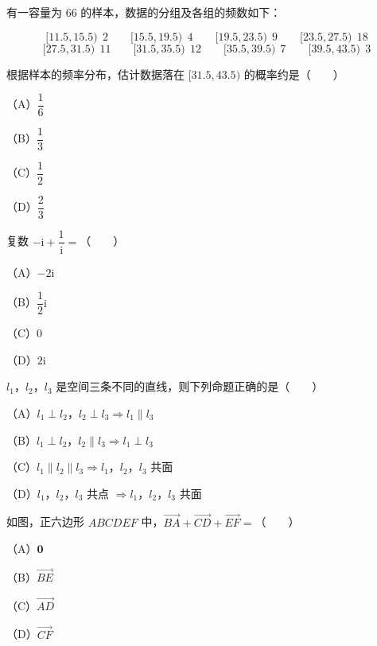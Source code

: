 \begin{question}
有一容量为 $66$ 的样本，数据的分组及各组的频数如下：

\nopagebreak[4]
\[[11.5,15.5)\ \ 2 \qquad [15.5,19.5)\ \ 4 \qquad [19.5,23.5)\ \ 9 \qquad [23.5,27.5)\ \ 18\]
\nopagebreak[4]
\[[27.5,31.5)\ \ 11 \qquad [31.5,35.5)\ \ 12 \qquad [35.5,39.5)\ \ 7 \qquad [39.5,43.5)\ \ 3\]

根据样本的频率分布，估计数据落在 $[31.5,43.5)$ 的概率约是\mbox{（　　）}

（A）$\dfrac16$

（B）$\dfrac13$

（C）$\dfrac12$

（D）$\dfrac23$

\end{question}
\begin{question}
复数 $-\mathrm i+\dfrac{1}{\mathrm i}=$\mbox{（　　）}

（A）$-2\mathrm i$

（B）$\dfrac12\mathrm i$

（C）$0$

（D）$2\mathrm i$

\end{question}
\begin{question}
$l_1$，$l_2$，$l_3$ 是空间三条不同的直线，则下列命题正确的是\mbox{（　　）}

（A）$l_1\perp l_2$，$l_2\perp l_3\Rightarrow l_1\parallel l_3$

（B）$l_1\perp l_2$，$l_2\parallel l_3\Rightarrow l_1\perp l_3$

（C）$l_1\parallel l_2\parallel l_3\Rightarrow l_1$，$l_2$，$l_3$ 共面

（D）$l_1$，$l_2$，$l_3$ 共点 $\Rightarrow l_1$，$l_2$，$l_3$ 共面

\Needspace{0.4\textheight}
\end{question}
\begin{question}
如图，正六边形 $ABCDEF$ 中，$\overrightarrow{BA}+\overrightarrow{CD}+\overrightarrow{EF}=$\mbox{（　　）}

（A）$\mathbf 0$

（B）$\overrightarrow{BE}$

（C）$\overrightarrow{AD}$

（D）$\overrightarrow{CF}$
\nopagebreak[4]
\begin{center}\end{center}
\nopagebreak[4]
\end{question}
